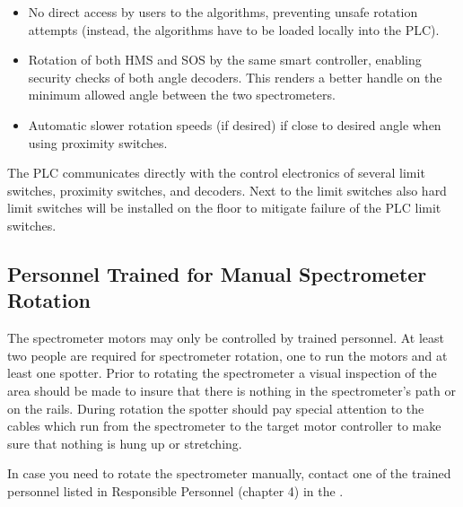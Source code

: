 {\begin{itemize}
\item{No direct access by users to the algorithms, preventing unsafe
rotation attempts (instead, the algorithms have to be loaded locally into
the PLC).}
\item{Rotation of both HMS and SOS by the same smart controller, enabling
security checks of both angle decoders. This renders a better handle on the
minimum allowed angle between the two spectrometers.}
\item{Automatic slower rotation speeds (if desired) if close to desired angle
when using proximity switches.}
\end{itemize}

The PLC communicates directly with the control electronics of several limit
switches, proximity switches, and decoders. Next to the limit switches
also hard limit switches will be installed on the floor to mitigate failure
of the PLC limit switches.


\subsection{Personnel Trained for Manual Spectrometer Rotation}

The spectrometer motors may only be controlled by trained personnel.
At least two people are required for spectrometer rotation, one to
run the motors and at least one spotter. Prior to rotating the spectrometer
a visual inspection of the area should be made to insure that there
is nothing in the spectrometer's path or on the rails. During rotation
the spotter should pay special attention to
the cables which run from the
spectrometer to the target motor controller to make sure that
nothing is hung up or stretching.

In case you need to rotate the spectrometer manually, contact one of the trained
personnel listed in Responsible Personnel (chapter 4) in
the .
}


